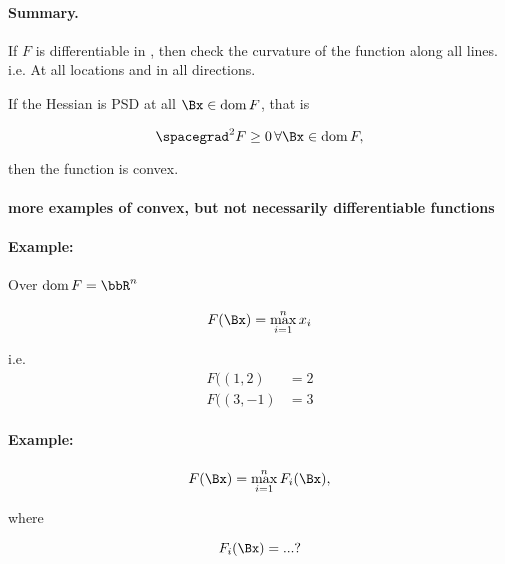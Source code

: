 \paragraph{Summary.}

If \( F \) is differentiable in , then check the curvature of the function along all lines.  i.e.  At all locations and in all directions.

If the Hessian is PSD at all \( \Bx \in \dom F \), that is

\begin{equation}\label{eqn:convexOptimizationLecture7:400}
\spacegrad^2 F \ge 0 \, \forall \Bx \in \dom F,
\end{equation}

then the function is convex.

\paragraph{more examples of convex, but not necessarily differentiable functions}

\paragraph{Example:}
Over \( \dom F = \bbR^n \)

\begin{dmath}\label{eqn:convexOptimizationLecture7:420}
F(\Bx) = \max_{i = 1}^n x_i
\end{dmath}

i.e.
\begin{dmath}\label{eqn:convexOptimizationLecture7:440}
\begin{aligned}
F((1,2) &= 2 \\
F((3,-1) &= 3
\end{aligned}
\end{dmath}

\paragraph{Example:}

\begin{dmath}\label{eqn:convexOptimizationLecture7:460}
F(\Bx) = \max_{i = 1}^n F_i(\Bx),
\end{dmath}

where

\begin{dmath}\label{eqn:convexOptimizationLecture7:480}
F_i(\Bx)
=
... ?
\end{dmath}

